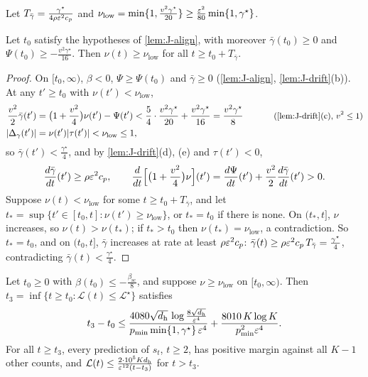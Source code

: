 Let $T_{\bar\gamma}=\frac{\gamma^\star}{4\rho\varepsilon^2c_p}$ and $\nu_{\mathrm{low}}=\min\{1,\frac{v^2\gamma^\star}{20}\}\ge\frac{\varepsilon^2}{80}\min\{1,\gamma^\star\}$.

\begin{lemma}
\label{lem:J-floor}
Let $t_0$ satisfy the hypotheses of \cref{lem:J-align}, with moreover $\bar\gamma(t_0)\ge0$ and $\Psi(t_0)\ge-\frac{v^2\gamma^\star}{16}$. Then $\nu(t)\ge \nu_{\mathrm{low}}$ for all
$t\ge t_0+T_{\bar\gamma}$.
\end{lemma}

\begin{proof}
On $[t_0,\infty)$, $\beta<0$, $\Psi\ge \Psi(t_0)$ and $\bar\gamma\ge0$ (\cref{lem:J-align}, \cref{lem:J-drift}(b)). At any $t'\ge t_0$ with $\nu(t')<\nu_{\mathrm{low}}$,
\begin{alignat*}{2}
 \tfrac{v^2}{2}\bar\gamma(t')&=\bigl(1+\tfrac{v^2}{4}\bigr)\nu(t')-\Psi(t')<\tfrac{5}{4}\cdot\tfrac{v^2\gamma^\star}{20}+\tfrac{v^2\gamma^\star}{16}=\tfrac{v^2\gamma^\star}{8} &\qquad& \why{\cref{lem:J-drift}(c), $v^2\le1$}\\
 |\Delta_\gamma(t')|&=\nu(t')|\tau(t')|<\nu_{\mathrm{low}}\le1,
\end{alignat*}
so $\bar\gamma(t')<\frac{\gamma^\star}{4}$, and by \cref{lem:J-drift}(d), (e) and $\tau(t')<0$,
\[
 \ddt{\bar\gamma}(t')\ge\rho\initscale^2c_p,\qquad \frac{d}{dt}\Bigl[\bigl(1+\tfrac{v^2}{4}\bigr)\nu\Bigr](t')=\ddt{\Psi}(t')+\tfrac{v^2}{2}\ddt{\bar\gamma}(t')>0 .
\]
Suppose $\nu(t)<\nu_{\mathrm{low}}$ for some $t\ge t_0+T_{\bar\gamma}$, and let $t_\ast=\sup\{t'\in[t_0,t]:\nu(t')\ge \nu_{\mathrm{low}}\}$, or $t_\ast=t_0$ if there is none. On $(t_\ast,t]$, $\nu$
increases, so $\nu(t)>\nu(t_\ast)$; if $t_\ast>t_0$ then $\nu(t_\ast)=\nu_{\mathrm{low}}$, a contradiction. So $t_\ast=t_0$, and on $(t_0,t]$, $\bar\gamma$ increases at rate at least
$\rho\varepsilon^2c_p$: $\bar\gamma(t)\ge\rho\varepsilon^2c_p\,T_{\bar\gamma}=\frac{\gamma^\star}{4}$, contradicting $\bar\gamma(t)<\frac{\gamma^\star}{4}$.
\end{proof}

\begin{lemma}
\label{lem:J-grow}
Let $t_0\ge0$ with $\beta(t_0)\le-\frac{\beta_{\mathrm{sc}}}{8}$, and suppose $\nu\ge \nu_{\mathrm{low}}$ on $[t_0,\infty)$. Then $t_3=\inf\{t\ge t_0:\mathcal L(t)\le\mathcal L^\star\}$ satisfies
\[
 t_3-t_0\le\frac{4080\sqrt{d_{\mathrm h}}\,\log\frac{8\sqrt{d_{\mathrm h}}}{\varepsilon^4}}{p_{\min}\min\{1,\gamma^\star\}\,\varepsilon^4}+\frac{8010\,K\log K}{p_{\min}^2\varepsilon^4} .
\]
For all $t\ge t_3$, every prediction of $s_t$, $t\ge2$, has positive margin against all $K-1$ other counts, and
$\mathcal L(t)\le\frac{2\cdot10^5Kd_{\mathrm h}}{\varepsilon^{12}(t-t_3)}$ for $t>t_3$.
\end{lemma}

